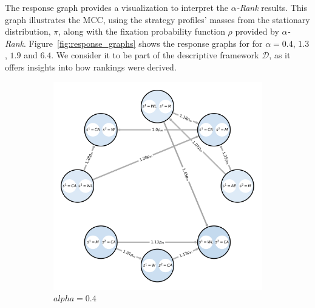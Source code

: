         \noindent
        The response graph provides a visualization to interpret the \emph{$\alpha$-Rank} results. This graph illustrates the MCC, using the strategy profiles' masses from the stationary distribution, $\pi$, along with the fixation probability function $\rho$ provided by \emph{$\alpha$-Rank}. Figure~\ref{fig:response_graphs} shows the response graphs for for $\alpha = 0.4$, $1.3$, $1.9$ and $6.4$. We consider it to be part of the descriptive framework $\mathcal{D}$, as it offers insights into how rankings were derived.
        \begin{figure}[H]
            \centering
            \begin{subfigure}[b]{0.45\linewidth}
                \includegraphics[width=\linewidth]{images/rg_0.4.png}
                \caption{$alpha=0.4$}
                \label{fig:response_graph_0.4}
            \end{subfigure}
            \hfill
            \begin{subfigure}[b]{0.45\linewidth}

\end{subfigure}
\end{figure}
